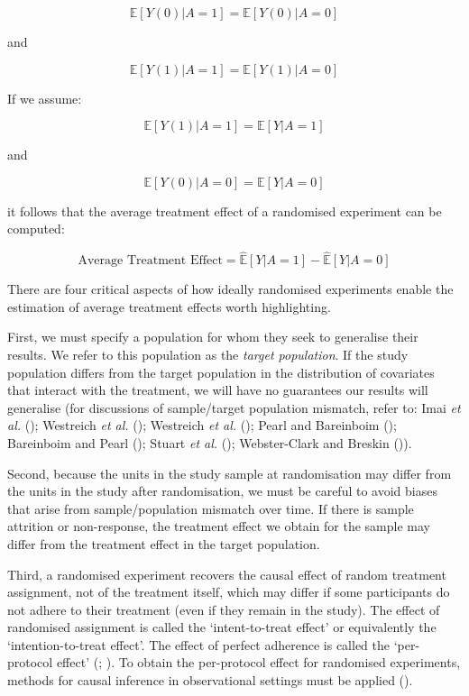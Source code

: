 \documentclass[
  single column]{article}
\begin{document}
\[
\mathbb{E}[Y(0) | A = 1] = \mathbb{E}[Y(0) | A = 0]
\]

and

\[
\mathbb{E}[Y(1) | A = 1] = \mathbb{E}[Y(1) | A = 0]
\]

If we assume:

\[ 
\mathbb{E}[Y(1) | A = 1] = \mathbb{E}[Y | A = 1]
\]

and

\[
\mathbb{E}[Y(0) | A = 0] = \mathbb{E}[Y | A = 0]
\]

it follows that the average treatment effect of a randomised experiment
can be computed:

\[
\text{Average Treatment Effect} = \widehat{\mathbb{E}}[Y | A = 1] - \widehat{\mathbb{E}}[Y | A = 0]
\]

There are four critical aspects of how ideally randomised experiments
enable the estimation of average treatment effects worth highlighting.

First, we must specify a population for whom they seek to generalise
their results. We refer to this population as the \emph{target
population}. If the study population differs from the target population
in the distribution of covariates that interact with the treatment, we
will have no guarantees our results will generalise (for discussions of
sample/target population mismatch, refer to: Imai \emph{et al.}
(); Westreich \emph{et
al.} (); Westreich \emph{et al.}
(); Pearl and Bareinboim
(); Bareinboim and Pearl
(); Stuart \emph{et al.}
(); Webster-Clark and
Breskin ()).

Second, because the units in the study sample at randomisation may
differ from the units in the study after randomisation, we must be
careful to avoid biases that arise from sample/population mismatch over
time. If there is sample attrition or non-response, the treatment effect
we obtain for the sample may differ from the treatment effect in the
target population.

Third, a randomised experiment recovers the causal effect of random
treatment assignment, not of the treatment itself, which may differ if
some participants do not adhere to their treatment (even if they remain
in the study). The effect of randomised assignment is called the
`intent-to-treat effect' or equivalently the `intention-to-treat
effect'. The effect of perfect adherence is called the `per-protocol
effect' (;
). To obtain the
per-protocol effect for randomised experiments, methods for causal
inference in observational settings must be applied
().
\end{document}
